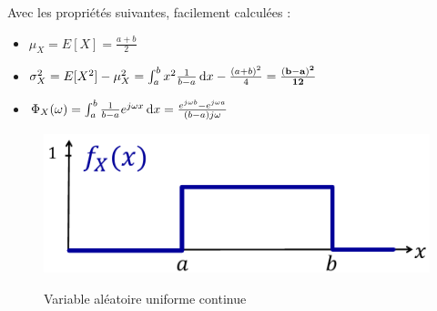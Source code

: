 \documentclass[11pt,a4paper]{article}
\numberwithin{equation}{section}
\begin{document}
Avec les propriétés suivantes, facilement calculées :
\begin{itemize}
    \item $\mu_X = E[X] = \frac{a+b}{2}$
    \item $\sigma_X^2 = E[X^2] - \mu_X^2 = \int_a^b x^2 \frac{1}{b-a} \, \mathrm d x - \frac{(a+b)^2}{4} = \mathbf{\frac{(b-a)^2}{12}}$
    \item $\Phi_X(\omega) = \int_a^b \frac{1}{b-a}e^{j\omega x} \, \mathrm d x = \frac{e^{j\omega b} - e^{j\omega a}}{(b-a)j\omega}$
\end{itemize}
\begin{figure}
    \centering
    \includegraphics[scale=0.2]{images/va_uniforme}
    \label{fig_va_uniforme}
    \caption{Variable aléatoire uniforme continue}
\end{figure}
\end{document}

